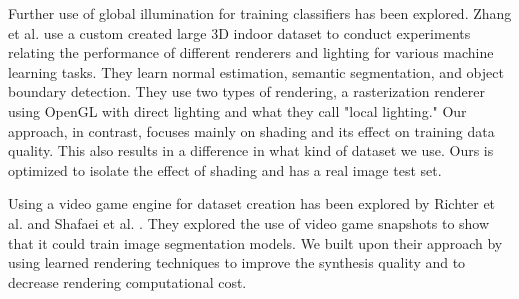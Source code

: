 \documentclass[10pt,twocolumn,letterpaper]{article}
\begin{document}
Further use of global illumination for training classifiers has been explored.
Zhang et al. \cite{DBLP:journals/corr/ZhangSYSLJF16} use a custom created large 3D indoor dataset to conduct experiments relating the performance of different renderers and lighting for various machine learning tasks. They learn normal estimation, semantic segmentation, and object boundary detection. They use two types of rendering, a rasterization renderer using OpenGL with direct lighting and what they call "local lighting." Our approach, in contrast, focuses mainly on shading and its effect on training data quality. This also results in a difference in what kind of dataset we use. Ours is optimized to isolate the effect of shading and has a real image test set.




Using a video game engine for dataset creation has been explored by Richter et al. \cite{DBLP:journals/corr/RichterVRK16} and  Shafaei et al. \cite{DBLP:journals/corr/ShafaeiLS16}. They explored the use of video game snapshots to show that it could train image segmentation models. We built upon their approach by using learned rendering techniques to improve the synthesis quality and to decrease rendering computational cost.
\end{document}
